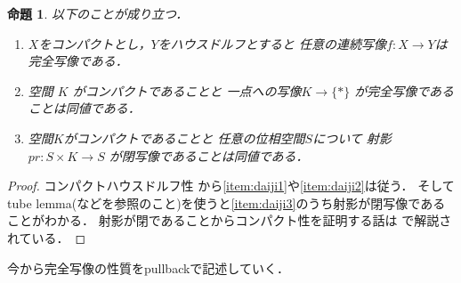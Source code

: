\documentclass[leqno, a4paper, 12pt, dvipdfmx]{jsarticle}
\newtheorem{prop}[thm]{命題}
\begin{document}
\begin{prop}\label{prop:compper}
以下のことが成り立つ．

\begin{enumerate}[label=\textup{(K\arabic*)}]
\item\label{item:daiji1}
$X$をコンパクトとし，$Y$をハウスドルフとすると
任意の連続写像$f\colon X\to Y$は完全写像である．


\item\label{item:daiji2}
空間
$K$
がコンパクトであることと
一点への写像$K\to \{*\}$
が完全写像であることは同値である．
\item\label{item:daiji3}
空間$K$がコンパクトであることと
任意の位相空間$S$について
射影$pr\colon S\times K\to S$
が閉写像であることは同値である．


\end{enumerate}
\end{prop}
\begin{proof}
コンパクトハウスドルフ性
から\ref{item:daiji1}や\ref{item:daiji2}は従う．
そしてtube lemma(\cite{dempa1}などを参照のこと)を使うと\ref{item:daiji3}のうち射影が閉写像であることがわかる．
射影が閉であることからコンパクト性を証明する話は
\cite{dempa2}で解説されている．
\end{proof}


今から完全写像の性質をpullbackで記述していく．
\end{document}
